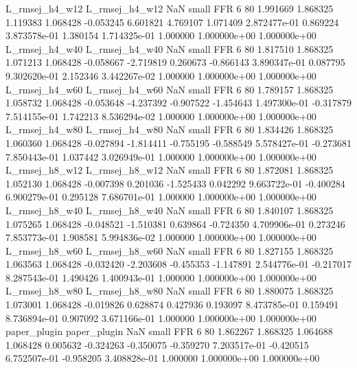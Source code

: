 L_rmsej_h4_w12 L_rmsej_h4_w12                   NaN      small      FFR                 6 80 1.991669       1.868325 1.119383       1.068428   -0.053245      6.601821      4.769107     1.071409   2.872477e-01  0.869224 3.873578e-01     1.380154   1.714325e-01            1.000000    1.000000e+00        1.000000e+00
L_rmsej_h4_w40 L_rmsej_h4_w40                   NaN      small      FFR                 6 80 1.817510       1.868325 1.071213       1.068428   -0.058667     -2.719819      0.260673    -0.866143   3.890347e-01  0.087795 9.302620e-01     2.152346   3.442267e-02            1.000000    1.000000e+00        1.000000e+00
L_rmsej_h4_w60 L_rmsej_h4_w60                   NaN      small      FFR                 6 80 1.789157       1.868325 1.058732       1.068428   -0.053648     -4.237392     -0.907522    -1.454643   1.497300e-01 -0.317879 7.514155e-01     1.742213   8.536294e-02            1.000000    1.000000e+00        1.000000e+00
L_rmsej_h4_w80 L_rmsej_h4_w80                   NaN      small      FFR                 6 80 1.834426       1.868325 1.060360       1.068428   -0.027894     -1.814411     -0.755195    -0.588549   5.578427e-01 -0.273681 7.850443e-01     1.037442   3.026949e-01            1.000000    1.000000e+00        1.000000e+00
L_rmsej_h8_w12 L_rmsej_h8_w12                   NaN      small      FFR                 6 80 1.872081       1.868325 1.052130       1.068428   -0.007398      0.201036     -1.525433     0.042292   9.663722e-01 -0.400284 6.900279e-01     0.295128   7.686701e-01            1.000000    1.000000e+00        1.000000e+00
L_rmsej_h8_w40 L_rmsej_h8_w40                   NaN      small      FFR                 6 80 1.840107       1.868325 1.075265       1.068428   -0.048521     -1.510381      0.639864    -0.724350   4.709906e-01  0.273246 7.853773e-01     1.908581   5.994836e-02            1.000000    1.000000e+00        1.000000e+00
L_rmsej_h8_w60 L_rmsej_h8_w60                   NaN      small      FFR                 6 80 1.827155       1.868325 1.063563       1.068428   -0.032420     -2.203608     -0.455353    -1.147891   2.544776e-01 -0.217017 8.287543e-01     1.490426   1.400943e-01            1.000000    1.000000e+00        1.000000e+00
L_rmsej_h8_w80 L_rmsej_h8_w80                   NaN      small      FFR                 6 80 1.880075       1.868325 1.073001       1.068428   -0.019826      0.628874      0.427936     0.193097   8.473785e-01  0.159491 8.736894e-01     0.907092   3.671166e-01            1.000000    1.000000e+00        1.000000e+00
  paper_plugin   paper_plugin                   NaN      small      FFR                 6 80 1.862267       1.868325 1.064688       1.068428    0.005632     -0.324263     -0.350075    -0.359270   7.203517e-01 -0.420515 6.752507e-01    -0.958205   3.408828e-01            1.000000    1.000000e+00        1.000000e+00
